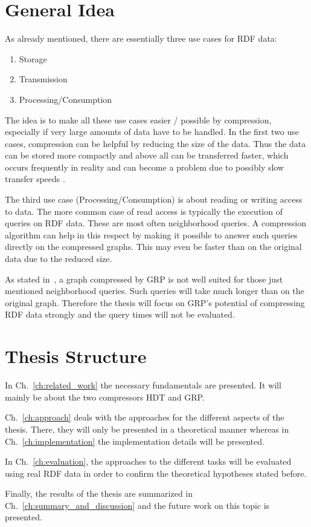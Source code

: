 \section{General Idea}

As already mentioned, there are essentially three use cases for RDF data:

\begin{enumerate}
	\item Storage
	\item Transmission
	\item Processing/Consumption
\end{enumerate}

The idea is to make all these use cases easier / possible by compression, especially if very large amounts of data have to be handled. In the first two use cases, compression can be helpful by reducing the size of the data. Thus the data can be stored more compactly and above all can be transferred faster, which occurs frequently in reality and can become a problem due to possibly slow transfer speeds .

The third use case (Processing/Consumption) is about reading or writing access to data. The more common case of read access is typically the execution of queries on RDF data. These are most often neighborhood queries. A compression algorithm can help in this respect by making it possible to answer such queries directly on the compressed graphs. This may even be faster than on the original data due to the reduced size.

As stated in~\cite{maneth}, a graph compressed by GRP is not well suited for those just mentioned neighborhood queries. Such queries will take much longer than on the original graph. Therefore the thesis will focus on GRP's potential of compressing RDF data strongly and the query times will not be evaluated.



\section{Thesis Structure}

In Ch.~\ref{ch:related_work} the necessary fundamentals are presented. It will mainly be about the two compressors HDT and GRP. 

Ch.~\ref{ch:approach} deals with the approaches for the different aspects of the thesis. There, they will only be presented in a theoretical manner whereas in Ch.~\ref{ch:implementation} the implementation details will be presented.

In Ch.~\ref{ch:evaluation}, the approaches to the different tasks will be evaluated using real RDF data in order to confirm the theoretical hypotheses stated before.

Finally, the results of the thesis are summarized in Ch.~\ref{ch:summary_and_discussion} and the future work on this topic is presented.








